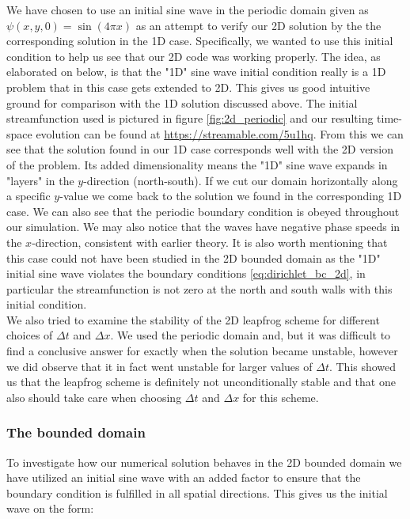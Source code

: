 \documentclass[12pt]{article}
\numberwithin{figure}{section}
\numberwithin{table}{section}
\begin{document}
\noindent We have chosen to use an initial sine wave in the periodic domain given as $\psi(x,y,0) = \sin(4 \pi x)$ as an attempt to verify our 2D solution by the the corresponding solution in the 1D case. Specifically, we wanted to use this initial condition to help us see that our 2D code was working properly. The idea, as elaborated on below, is that the "1D" sine wave initial condition really is a 1D problem that in this case gets extended to 2D. This gives us good intuitive ground for comparison with the 1D solution discussed above. The initial streamfunction used is pictured in figure \ref{fig:2d_periodic} and our resulting time-space evolution can be found at \url{https://streamable.com/5u1hq}. From this we can see that the solution found in our 1D case corresponds well with the 2D version of the problem. Its added dimensionality means the "1D" sine wave expands in "layers" in the $y$-direction (north-south). If we cut our domain horizontally along a specific $y$-value we come back to the solution we found in the corresponding 1D case. We can also see that the periodic boundary condition is obeyed throughout our simulation. We may also notice that the waves have negative phase speeds in the $x$-direction, consistent with earlier theory. It is also worth mentioning that this case could not have been studied in the 2D bounded domain as the "1D" initial sine wave violates the boundary conditions \eqref{eq:dirichlet_bc_2d}, in particular the streamfunction is not zero at the north and south walls with this initial condition.\\

\noindent We also tried to examine the stability of the 2D leapfrog scheme for different choices of $\Delta t$ and $\Delta x$. We used the periodic domain and, but it was difficult to find a conclusive answer for exactly when the solution became unstable, however we did observe that it in fact went unstable for larger values of $\Delta t$. This showed us that the leapfrog scheme is definitely not unconditionally stable and that one also should take care when choosing $\Delta t$ and $\Delta x$ for this scheme.



\subsubsection{The bounded domain}
\noindent To investigate how our numerical solution behaves in the 2D bounded domain we have utilized an initial sine wave with an added factor to ensure that the boundary condition is fulfilled in all spatial directions. This gives us the initial wave on the form:
\end{document}
